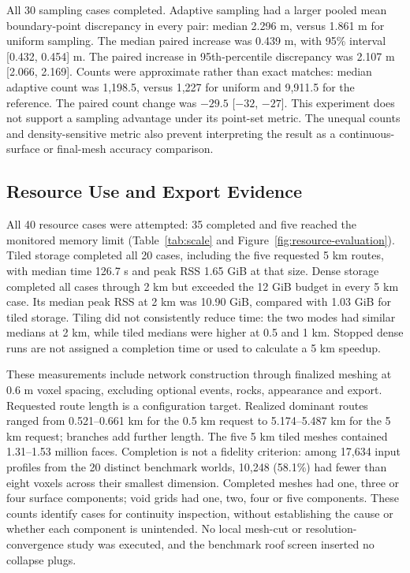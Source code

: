\documentclass[conference]{IEEEtran}
\begin{document}
All 30 sampling cases completed. Adaptive sampling had a larger pooled mean boundary-point discrepancy in every pair: median 2.296 m, versus 1.861 m for uniform sampling. The median paired increase was 0.439 m, with 95\% interval [0.432, 0.454] m. The paired increase in 95th-percentile discrepancy was 2.107 m [2.066, 2.169]. Counts were approximate rather than exact matches: median adaptive count was 1,198.5, versus 1,227 for uniform and 9,911.5 for the reference. The paired count change was $-29.5$ [$-32$, $-27$]. This experiment does not support a sampling advantage under its point-set metric. The unequal counts and density-sensitive metric also prevent interpreting the result as a continuous-surface or final-mesh accuracy comparison.

\begin{table}[t]
\caption{Paired routing-term effects relative to the full model. Values are median paired changes; brackets give pointwise 95\% bootstrap intervals. Each intervention has 100 valid pairs.}
\label{tab:ablation}
\centering\small

\end{table}

\subsection{Resource Use and Export Evidence}
All 40 resource cases were attempted: 35 completed and five reached the monitored memory limit (Table~\ref{tab:scale} and Figure~\ref{fig:resource-evaluation}). Tiled storage completed all 20 cases, including the five requested 5 km routes, with median time 126.7 s and peak RSS 1.65 GiB at that size. Dense storage completed all cases through 2 km but exceeded the 12 GiB budget in every 5 km case. Its median peak RSS at 2 km was 10.90 GiB, compared with 1.03 GiB for tiled storage. Tiling did not consistently reduce time: the two modes had similar medians at 2 km, while tiled medians were higher at 0.5 and 1 km. Stopped dense runs are not assigned a completion time or used to calculate a 5 km speedup.

These measurements include network construction through finalized meshing at 0.6 m voxel spacing, excluding optional events, rocks, appearance and export. Requested route length is a configuration target. Realized dominant routes ranged from 0.521--0.661 km for the 0.5 km request to 5.174--5.487 km for the 5 km request; branches add further length. The five 5 km tiled meshes contained 1.31--1.53 million faces. Completion is not a fidelity criterion: among 17,634 input profiles from the 20 distinct benchmark worlds, 10,248 (58.1\%) had fewer than eight voxels across their smallest dimension. Completed meshes had one, three or four surface components; void grids had one, two, four or five components. These counts identify cases for continuity inspection, without establishing the cause or whether each component is unintended. No local mesh-cut or resolution-convergence study was executed, and the benchmark roof screen inserted no collapse plugs.
\end{document}
